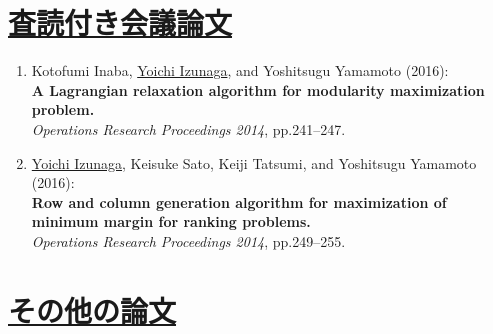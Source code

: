 \documentclass[a4j,uplatex,9pt]{jsarticle}
\begin{document}
\section*{\underline{査読付き会議論文}}

\begin{enumerate}

\item Kotofumi Inaba, \underline{Yoichi Izunaga}, and Yoshitsugu Yamamoto (2016):\\
{\bf A Lagrangian relaxation algorithm for modularity maximization problem.}\\
{\it Operations Research Proceedings 2014}, pp.241--247.

\item \underline{Yoichi Izunaga}, Keisuke Sato, Keiji Tatsumi, and Yoshitsugu Yamamoto (2016):\\
{\bf Row and column generation algorithm for maximization of minimum margin for ranking problems.}\\
{\it Operations Research Proceedings 2014}, pp.249--255.

\end{enumerate}


\section*{\underline{その他の論文}}
\end{document}
